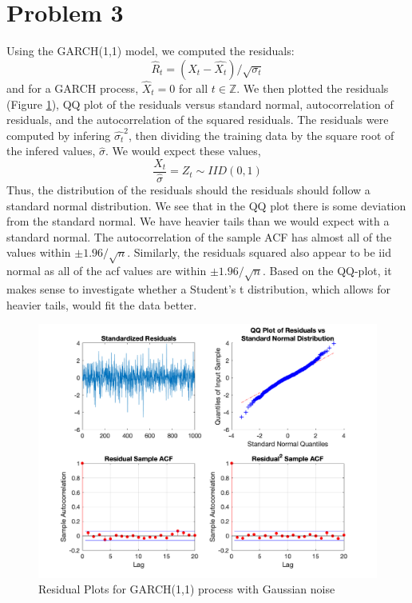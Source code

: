 \documentclass{article}
\begin{document}
\section*{Problem 3}

Using the GARCH(1,1) model, we computed the residuals:
$$
\hat{R}_t = (X_t - \hat{X_t})/\sqrt{\sigma_t}
$$
and for a GARCH process, $\hat{X}_t = 0$ for all $t \in \mathbb Z$.
We then plotted the residuals (Figure \ref{fig:residual_plots_norm}), QQ plot of the residuals versus standard normal, autocorrelation of residuals, and the autocorrelation of the squared residuals.
The residuals were computed by infering $\hat{\sigma_t}^2$, then dividing the training data by the square root of the infered values, $\hat{\sigma}$.
We would expect these values,
$$
\frac{X_t}{\hat{\sigma}} = Z_t \sim IID(0,1)
$$
Thus, the distribution of the residuals should the residuals should follow a standard normal distribution.
We see that in the QQ plot there is some deviation from the standard normal.
We have heavier tails than we would expect with a standard normal.
The autocorrelation of the sample ACF has almost all of the values within $\pm 1.96 / \sqrt{n}$.
Similarly, the residuals squared also appear to be iid normal as all of the acf values are within $\pm 1.96 / \sqrt{n}$.
Based on the QQ-plot, it makes sense to investigate whether a Student's t distribution, which allows for heavier tails, would fit the data better.

\begin{figure}[H]
\includegraphics[width=16cm]{plots/residual_plots_norm.png}
\centering
\caption{Residual Plots for GARCH(1,1) process with Gaussian noise}
\label{fig:residual_plots_norm}
\end{figure}
\end{document}
